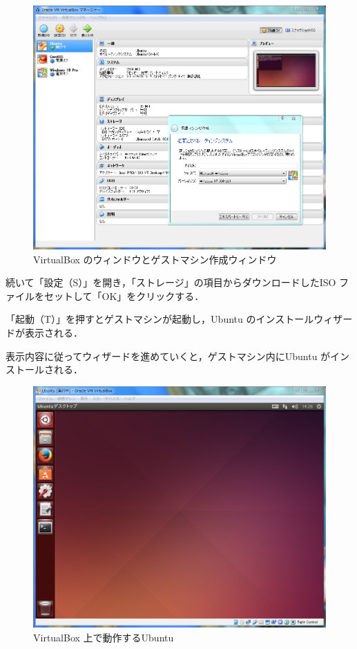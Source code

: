\begin{figure}[H]
\centering
\includegraphics[width=12cm]{VBoxWindow.PNG}
\caption{VirtualBox のウィンドウとゲストマシン作成ウィンドウ}\label{サンプル図}
\end{figure}

続いて「設定（S）」を開き，「ストレージ」の項目からダウンロードしたISO ファイルをセットして「OK」をクリックする．

「起動（T）」を押すとゲストマシンが起動し，Ubuntu のインストールウィザードが表示される．

表示内容に従ってウィザードを進めていくと，ゲストマシン内にUbuntu がインストールされる．


\begin{figure}[H]
\centering
\includegraphics[width=14cm]{Ubuntu_on_VirtualBox.PNG}
\caption{VirtualBox 上で動作するUbuntu}\label{サンプル図}
\end{figure}


